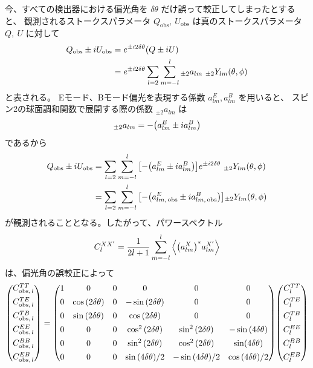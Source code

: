 \documentclass[../../main.tex]{subfiles}
\begin{document}
今、すべての検出器における偏光角を $\delta \theta$ だけ誤って較正してしまったとすると、
観測されるストークスパラメータ $Q_{\mathrm{obs}},\ U_{\mathrm{obs}}$ は真のストークスパラメータ $Q,\ U$ に対して
\begin{align}
    Q_{\mathrm{obs}} \pm iU_{\mathrm{obs}} &= e^{\pm i2\delta\theta}\qty(Q \pm iU) \\
    &= e^{\pm i2\delta\theta}\sum_{l=2}\sum_{m=-l}^{l} {}_{\pm 2}a_{lm}\ {}_{\pm 2}Y_{lm}(\theta, \phi)
\end{align}
と表される。\cite{so:Keeting_2023}\cite{so:Kaufman_2014}
Eモード、Bモード偏光を表現する係数 $a_{lm}^{E}, a_{lm}^{B}$ を用いると、
スピン2の球面調和関数で展開する際の係数 ${}_{\pm 2}a_{lm}$ は
\begin{equation}
    {}_{\pm 2}a_{lm} = -\qty(a_{lm}^{E} \pm i a_{lm}^{B})
\end{equation}
であるから
\begin{align}
    Q_{\mathrm{obs}} \pm iU_{\mathrm{obs}} &= \sum_{l=2}\sum_{m=-l}^{l} \qty[-\qty(a_{lm}^{E} \pm i a_{lm}^{B})]e^{\pm i2\delta\theta}\ {}_{\pm 2}Y_{lm}(\theta, \phi) \\
    &= \sum_{l=2}\sum_{m=-l}^{l} \qty[-\qty(a_{lm,\,\mathrm{obs}}^{E} \pm i a_{lm,\,\mathrm{obs}}^{B})] {}_{\pm2}Y_{lm}(\theta, \phi)
\end{align}
が観測されることとなる。したがって、パワースペクトル
\begin{equation}
    C_{l}^{XX'} = \dfrac{1}{2l+1}\sum_{m=-l}^{l}\left\langle \qty(a_{lm}^{X})^{*} a_{lm}^{X'} \right\rangle
\end{equation}
は、偏光角の誤較正によって
\begin{equation}
    \mqty( C_{\mathrm{obs},\,l}^{TT} \\[1ex]
           C_{\mathrm{obs},\,l}^{TE} \\[1ex]
           C_{\mathrm{obs},\,l}^{TB} \\[1ex]
           C_{\mathrm{obs},\,l}^{EE} \\[1ex]
           C_{\mathrm{obs},\,l}^{BB} \\[1ex]
           C_{\mathrm{obs},\,l}^{EB} )
    = \mqty( 1 & 0 & 0 & 0 & 0 & 0 \\[1ex]
             0 & \cos\qty(2\delta\theta) & 0 & -\sin\qty(2\delta\theta) & 0 & 0 \\[1ex]
             0 & \sin\qty(2\delta\theta) & 0 & \cos\qty(2\delta\theta) & 0 & 0 \\[1ex]
             0 & 0 & 0 & \cos^2\qty(2\delta\theta) & \sin^2\qty(2\delta\theta) & -\sin\qty(4\delta\theta) \\[1ex]
             0 & 0 & 0 & \sin^2\qty(2\delta\theta) & \cos^2\qty(2\delta\theta) & \sin(4\delta\theta) \\[1ex]
             0 & 0 & 0 & \sin\qty(4\delta\theta)/2 & -\sin\qty(4\delta\theta)/2 & \cos\qty(4\delta\theta)/2 )
    \mqty( C_{l}^{TT} \\[1ex]
              C_{l}^{TE} \\[1ex]
              C_{l}^{TB} \\[1ex]
              C_{l}^{EE} \\[1ex]
              C_{l}^{BB} \\[1ex]
              C_{l}^{EB} )
\end{equation}
\end{document}
